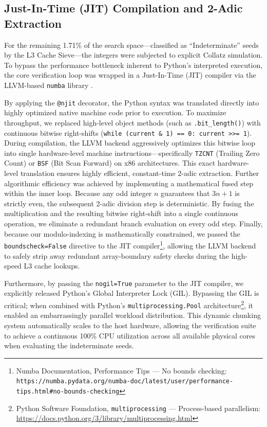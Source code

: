 \documentclass[11pt, a4paper]{article}
\theoremstyle{definition}
\begin{document}
\subsection{Just-In-Time (JIT) Compilation and 2-Adic Extraction}

For the remaining 1.71\% of the search space---classified as ``Indeterminate'' seeds by the L3 Cache Sieve---the integers were subjected to explicit Collatz simulation. To bypass the performance bottleneck inherent to Python's interpreted execution, the core verification loop was wrapped in a Just-In-Time (JIT) compiler via the LLVM-based \texttt{numba} library \cite{Lam2015}.

By applying the \texttt{@njit} decorator, the Python syntax was translated directly into highly optimized native machine code prior to execution. To maximize throughput, we replaced high-level object methods (such as \texttt{.bit\_length()}) with continuous bitwise right-shifts (\texttt{while (current \& 1) == 0: current >>= 1}). During compilation, the LLVM backend aggressively optimizes this bitwise loop into single hardware-level machine instructions---specifically \texttt{TZCNT} (Trailing Zero Count) or \texttt{BSF} (Bit Scan Forward) on x86 architectures. This exact hardware-level translation ensures highly efficient, constant-time 2-adic extraction. Further algorithmic efficiency was achieved by implementing a mathematical fused step within the inner loop. Because any odd integer $n$ guarantees that $3n+1$ is strictly even, the subsequent 2-adic division step is deterministic. By fusing the multiplication and the resulting bitwise right-shift into a single continuous operation, we eliminate a redundant branch evaluation on every odd step. Finally, because our modulo-indexing is mathematically constrained, we passed the \texttt{boundscheck=False} directive to the JIT compiler\footnote{Numba Documentation, Performance Tips --- No bounds checking: \texttt{https://numba.pydata.org/numba-doc/latest/user/performance-tips.html\#no-bounds-checking}}, allowing the LLVM backend to safely strip away redundant array-boundary safety checks during the high-speed L3 cache lookups.

Furthermore, by passing the \texttt{nogil=True} parameter to the JIT compiler, we explicitly released Python's Global Interpreter Lock (GIL). Bypassing the GIL is critical; when combined with Python's \texttt{multiprocessing.Pool} architecture\footnote{Python Software Foundation, \texttt{multiprocessing} --- Process-based parallelism: \url{https://docs.python.org/3/library/multiprocessing.html}}, it enabled an embarrassingly parallel workload distribution. This dynamic chunking system automatically scales to the host hardware, allowing the verification suite to achieve a continuous 100\% CPU utilization across all available physical cores when evaluating the indeterminate seeds.
\end{document}
